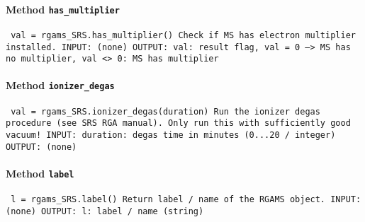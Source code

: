 \paragraph{Method \texttt{has_multiplier}}
\vspace{1ex}
\texttt{\newline
val = rgams_SRS.has_multiplier()\newline
\newline
Check if MS has electron multiplier installed.\newline
\newline
INPUT:\newline
(none)\newline
\newline
OUTPUT:\newline
val: result flag, val = 0 --> MS has no multiplier, val <> 0: MS has multiplier\newline
\newline
}

\paragraph{Method \texttt{ionizer_degas}}
\vspace{1ex}
\texttt{\newline
val = rgams_SRS.ionizer_degas(duration)\newline
\newline
Run the ionizer degas procedure (see SRS RGA manual). Only run this with sufficiently good vacuum!\newline
\newline
INPUT:\newline
duration: degas time in minutes (0...20 / integer)\newline
\newline
OUTPUT:\newline
(none)\newline
\newline
}

\paragraph{Method \texttt{label}}
\vspace{1ex}
\texttt{\newline
l = rgams_SRS.label()\newline
\newline
Return label / name of the RGAMS object.\newline
\newline
INPUT:\newline
(none)\newline
\newline
OUTPUT:\newline
l: label / name (string)\newline
\newline
}

